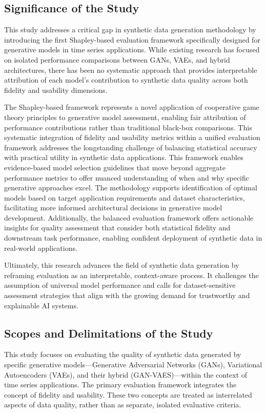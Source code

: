 \documentclass{article}
\begin{document}
\subsection{Significance of the Study}

This study addresses a critical gap in synthetic data generation methodology by introducing the first Shapley-based evaluation framework specifically designed for generative models in time series applications. While existing research has focused on isolated performance comparisons between GANs, VAEs, and hybrid architectures, there has been no systematic approach that provides interpretable attribution of each model's contribution to synthetic data quality across both fidelity and usability dimensions.

The Shapley-based framework represents a novel application of cooperative game theory principles to generative model assessment, enabling fair attribution of performance contributions rather than traditional black-box comparisons. This systematic integration of fidelity and usability metrics within a unified evaluation framework addresses the longstanding challenge of balancing statistical accuracy with practical utility in synthetic data applications. This framework enables evidence-based model selection guidelines that move beyond aggregate performance metrics to offer nuanced understanding of when and why specific generative approaches excel. The methodology supports identification of optimal models based on target application requirements and dataset characteristics, facilitating more informed architectural decisions in generative model development. Additionally, the balanced evaluation framework offers actionable insights for quality assessment that consider both statistical fidelity and downstream task performance, enabling confident deployment of synthetic data in real-world applications.

Ultimately, this research advances the field of synthetic data generation by reframing evaluation as an interpretable, context-aware process. It challenges the assumption of universal model performance and calls for dataset-sensitive assessment strategies that align with the growing demand for trustworthy and explainable AI systems.

\subsection{Scopes and Delimitations of the Study}
This study focuses on evaluating the quality of synthetic data generated by specific generative models—Generative Adversarial Networks (GANs), Variational Autoencoders (VAEs), and their hybrid (GAN-VAES)—within the context of time series applications. The primary evaluation framework integrates the concept of fidelity and usability. These two concepts are treated as interrelated aspects of data quality, rather than as separate, isolated evaluative criteria.
\end{document}
